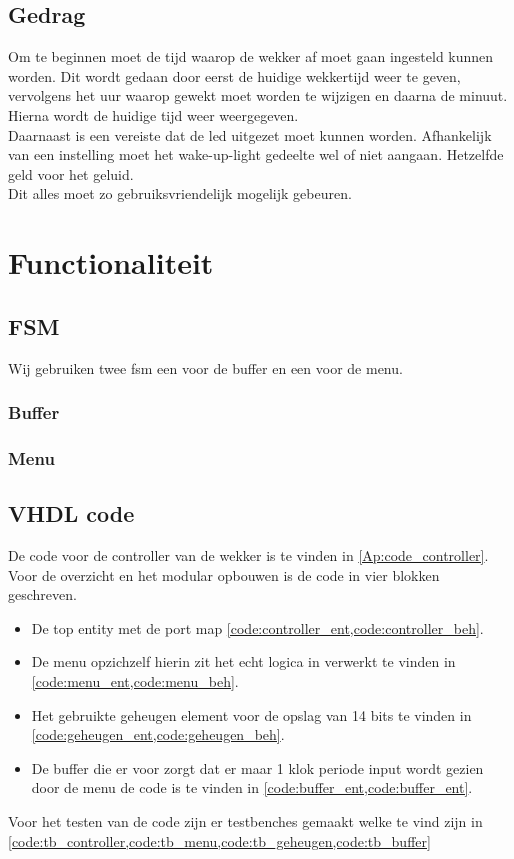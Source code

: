 \subsection{Gedrag}
Om te beginnen moet de tijd waarop de wekker af moet gaan ingesteld kunnen worden. Dit wordt gedaan door eerst de huidige wekkertijd weer te geven, vervolgens het uur waarop gewekt moet worden te wijzigen en daarna de minuut. Hierna wordt de huidige tijd weer weergegeven. \\
Daarnaast is een vereiste dat de led uitgezet moet kunnen worden. Afhankelijk van een instelling moet het wake-up-light gedeelte wel of niet aangaan. Hetzelfde geld voor het geluid. \\
Dit alles moet zo gebruiksvriendelijk mogelijk gebeuren.

\section{Functionaliteit}

\subsection{FSM}
Wij gebruiken twee fsm een voor de buffer en een voor de menu.
\subsubsection{Buffer}
\subsubsection{Menu}

\subsection{VHDL code}
De code voor de controller van de wekker is te vinden in \cref{Ap:code_controller}. Voor de overzicht en het modular opbouwen is de code in vier blokken geschreven.
\begin{itemize}[nolistsep]
\item De top entity met de port map \cref{code:controller_ent,code:controller_beh}.
\item De menu opzichzelf hierin zit het echt logica in verwerkt te vinden in \cref{code:menu_ent,code:menu_beh}.
\item Het gebruikte geheugen element voor de opslag van 14 bits te vinden in \cref{code:geheugen_ent,code:geheugen_beh}.
\item De buffer die er voor zorgt dat er maar 1 klok periode input wordt gezien door de menu de code is te vinden in \cref{code:buffer_ent,code:buffer_ent}.
\end{itemize}
Voor het testen van de code zijn er testbenches gemaakt welke te vind zijn in \cref{code:tb_controller,code:tb_menu,code:tb_geheugen,code:tb_buffer}
